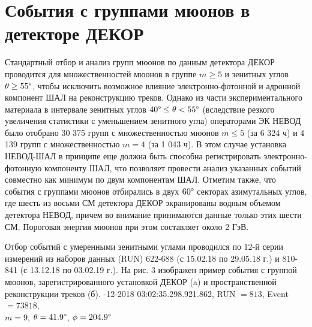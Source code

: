 \chapter*{События с группами мюонов в детекторе ДЕКОР}
\label{ch:intro}
Стандартный отбор и анализ групп мюонов по данным детектора ДЕКОР проводится для множественностей мюонов в группе \(m \geq 5\) и зенитных углов \(\theta \geq 55\degree\), чтобы исключить возможное влияние электронно-фотонной и адронной компонент ШАЛ на реконструкцию треков. Однако из части экспериментального материала в интервале зенитных углов \(40\degree \leq \theta < 55\degree\) (вследствие резкого увеличения статистики с уменьшением зенитного угла) операторами ЭК НЕВОД было отобрано 30 375 групп с множественностью мюонов \(m \leq 5\) (за 6 324 ч) и 4 139 групп с множественностью \(m = 4\) (за 1 043 ч). В этом случае установка НЕВОД-ШАЛ в принципе еще должна быть способна регистрировать электронно-фотонную компоненту ШАЛ, что позволяет провести анализ указанных событий совместно как минимум по двум компонентам ШАЛ. Отметим также, что события с группами мюонов отбирались в двух \(60\degree\) секторах азимутальных углов, где шесть из восьми СМ детектора ДЕКОР экранированы водным объемом детектора НЕВОД, причем во внимание принимаются данные только этих шести СМ. Пороговая энергия мюонов при этом составляет около 2 ГэВ. 

Отбор событий с умеренными зенитными углами проводился по 12-й серии измерений из наборов данных (RUN) 622-688 (с 15.02.18 по 29.05.18 г.) и 810-841 (с 13.12.18 по 03.02.19 г.). На рис. 3 изображен пример события с группой мюонов, зарегистрированного установкой ДЕКОР (a) и пространственной реконструкции треков (б).
\newpage
{}-12-2018 03:02:35.298.921.862, RUN \(=813\),  Event \(=73818\),\\
\(m = 9\), \(\theta = 41.9\degree\), \(\phi=204.9\degree\)

